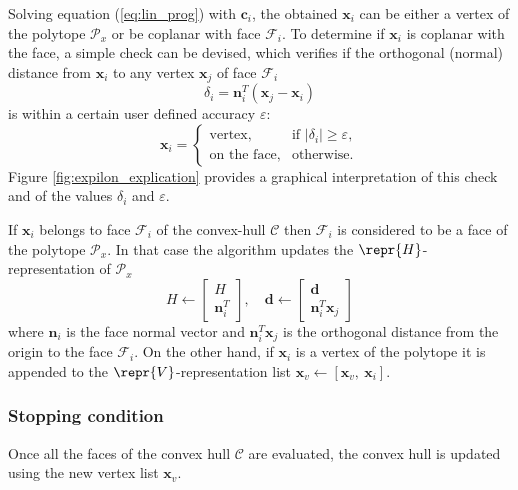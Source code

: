 Solving equation (\ref{eq:lin_prog}) with $\bm{c}_i$, the obtained $\bm{x}_i$ can be either a vertex of the polytope $\mathcal{P}_x$ or be coplanar with face $\mathcal{F}_i$. To determine if  $\bm{x}_i$ is coplanar with the face, a simple check can be devised, which verifies if the orthogonal (normal) distance from $\bm{x}_i$ to any vertex $\bm{x}_{j}$ of face $\mathcal{F}_i$
\begin{equation}
    \delta_i = \bm{n}_i^T(\bm{x}_{j} - \bm{x}_i)
\label{eq:normal_distance}
\end{equation}
is within a certain user defined accuracy $\varepsilon$:
\begin{equation}
    \bm{x}_i = \begin{cases}
   \text{vertex}, & \text{if }  |\delta_i| \geq \varepsilon, \\
    \text{on the face}, & \text{otherwise}.
\end{cases} 
\label{eq:normal_coplanar_test}
\end{equation}
Figure \ref{fig:expilon_explication} provides a graphical interpretation of this check and of the values $\delta_i$ and $\varepsilon$.

If $\bm{x}_i$ belongs to face $\mathcal{F}_i$ of the convex-hull $\mathcal{C}$ then  $\mathcal{F}_i$ is considered to be a face of the polytope $\mathcal{P}_x$. In that case the algorithm updates the $\repr{H}$-representation of $\mathcal{P}_x$ 
\begin{equation}
    H \leftarrow \begin{bmatrix} H \\ \bm{n}_i^T\end{bmatrix}, \quad \bm{d} \leftarrow \begin{bmatrix}  \bm{d} \\ \bm{n}^T_i \bm{x}_{j} \end{bmatrix}
\label{eq:h_rep}
\end{equation}
where $\bm{n}_i$ is the face normal vector and $\bm{n}_i^T \bm{x}_{j}$ is the orthogonal distance from the origin to the face $\mathcal{F}_i$. On the other hand, if $\bm{x}_i$ is a vertex of the polytope it is appended to the $\repr{V}$-representation list $\bm{x}_v \leftarrow [\bm{x}_v, ~\bm{x}_i]$.

\subsubsection{Stopping condition} 
Once all the faces of the convex hull $\mathcal{C}$ are evaluated, the convex hull is updated using the new vertex list $\bm{x}_v$.

